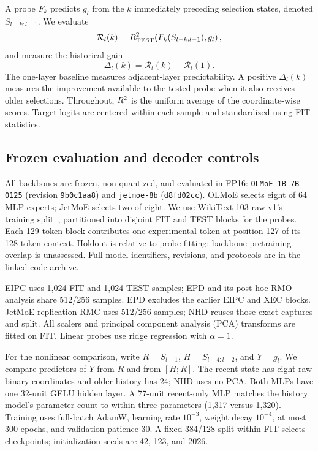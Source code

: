 \documentclass[10pt,letterpaper,twocolumn]{yalearxiv}
\begin{document}
A probe $F_k$ predicts $g_l$ from the $k$ immediately preceding selection states, denoted $S_{l-k:l-1}$. We evaluate
\begin{equation}
\mathcal{R}_l(k)=R^2_{\mathrm{TEST}}\!\left(F_k(S_{l-k:l-1}),g_l\right),
\end{equation}
and measure the historical gain
\begin{equation}
\Delta_l(k)=\mathcal{R}_l(k)-\mathcal{R}_l(1).
\end{equation}
The one-layer baseline measures adjacent-layer predictability. A positive $\Delta_l(k)$ measures the improvement available to the tested probe when it also receives older selections. Throughout, $R^2$ is the uniform average of the coordinate-wise scores. Target logits are centered within each sample and standardized using FIT statistics.

\subsection{Frozen evaluation and decoder controls}
All backbones are frozen, non-quantized, and evaluated in FP16: \texttt{OLMoE-1B-7B-0125} (revision \texttt{9b0c1aa8}) and \texttt{jetmoe-8b} (\texttt{d8fd02cc}). OLMoE selects eight of 64 MLP experts; JetMoE selects two of eight. We use WikiText-103-raw-v1's training split~\citep{wikitext}, partitioned into disjoint FIT and TEST blocks for the probes. Each 129-token block contributes one experimental token at position 127 of its 128-token context. Holdout is relative to probe fitting; backbone pretraining overlap is unassessed. Full model identifiers, revisions, and protocols are in the linked code archive.

EIPC uses 1,024 FIT and 1,024 TEST samples; EPD and its post-hoc RMO analysis share 512/256 samples. EPD excludes the earlier EIPC and XEC blocks. JetMoE replication RMC uses 512/256 samples; NHD reuses those exact captures and split. All scalers and principal component analysis (PCA) transforms are fitted on FIT. Linear probes use ridge regression with $\alpha=1$.

For the nonlinear comparison, write $R=S_{l-1}$, $H=S_{l-4:l-2}$, and $Y=g_l$. We compare predictors of $Y$ from $R$ and from $[H;R]$. The recent state has eight raw binary coordinates and older history has 24; NHD uses no PCA. Both MLPs have one 32-unit GELU hidden layer. A 77-unit recent-only MLP matches the history model's parameter count to within three parameters (1,317 versus 1,320). Training uses full-batch AdamW, learning rate $10^{-3}$, weight decay $10^{-4}$, at most 300 epochs, and validation patience 30. A fixed 384/128 split within FIT selects checkpoints; initialization seeds are 42, 123, and 2026.
\end{document}
